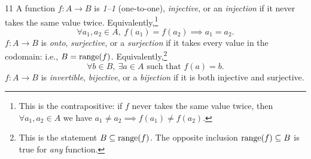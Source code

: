 
\begin{defn}{}{11}
A function $f:A\to B$ is \emph{1--1} (one-to-one), \emph{injective}, or an \emph{injection} if it never takes the same value twice. Equivalently,\footnote{This is the contrapositive: if $f$ never takes the same value twice, then $\forall a_1, a_2\in A$ we have $a_1\neq a_2\implies f(a_1)\neq f(a_2)$.}
\[\forall a_1,a_2\in A,\ f(a_1)=f(a_2)\implies a_1=a_2.\]
$f:A\to B$ is \emph{onto}, \emph{surjective}, or a \emph{surjection} if it takes every value in the codomain: i.e., $B=\operatorname{range}(f)$. Equivalently,\footnote{This is the statement $B\subseteq\operatorname{range}(f)$. The opposite inclusion $\operatorname{range}(f)\subseteq B$ is true for \emph{any} function.}
\[\forall b\in B,\ \exists a\in A\text{ such that }f(a)=b.\]
$f:A\to B$ is \emph{invertible}, \emph{bijective}, or a \emph{bijection} if it is both injective and surjective.
\end{defn}

